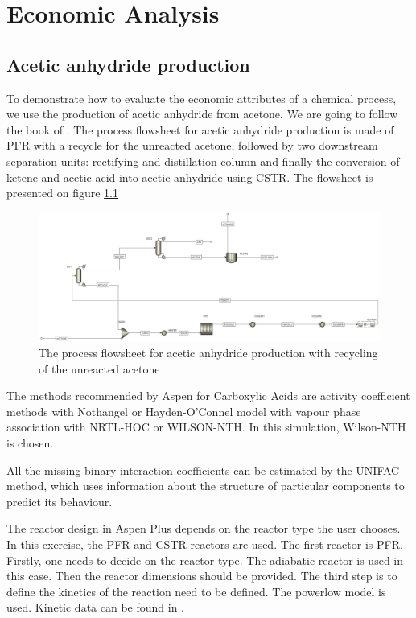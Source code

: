 \chapter{Economic Analysis}

\section{Acetic anhydride production}

	To demonstrate how to evaluate the economic attributes of a chemical process, we use the production of acetic anhydride from acetone. We are going to follow the book of \cite{AlMalah2016}. The process flowsheet for acetic anhydride production is made of PFR with a recycle for the unreacted acetone, followed by two downstream separation units: rectifying and distillation column and finally the conversion of ketene and acetic acid into acetic anhydride using CSTR. The flowsheet is presented on figure \ref{fig:Acetic_Flowsheet}
	
	\begin{figure}[h!]
		\centering
		\includegraphics[trim= 0cm 0cm 0cm 0cm,clip,width=\textwidth]{Cost_estimation/Figures/Flowsheet.jpg}
		\caption{The process flowsheet for acetic anhydride production with recycling of the unreacted acetone}
		\label{fig:Acetic_Flowsheet}
	\end{figure}

	The methods recommended by Aspen for Carboxylic Acids are activity coefficient methods with Nothangel or Hayden-O'Connel model with vapour phase association with NRTL-HOC or WILSON-NTH. In this simulation, Wilson-NTH is chosen. 
	
	All the missing binary interaction coefficients can be estimated by the UNIFAC method, which uses information about the structure of particular components to predict its behaviour. 
	
	The reactor design in Aspen Plus depends on the reactor type the user chooses. In this exercise, the PFR and CSTR reactors are used. The first reactor is PFR. Firstly, one needs to decide on the reactor type. The adiabatic reactor is used in this case. Then the reactor dimensions should be provided. The third step is to define the kinetics of the reaction need to be defined. The powerlow model is used. Kinetic data can be found in \cite{Fogler1974}. 
	
